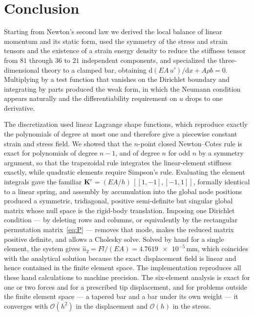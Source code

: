 \documentclass[11pt,a4paper]{article}
\numberwithin{equation}{section}
\theoremstyle{remark}
\newcommand{\bigO}[1]{\mathcal{O}\!\left(#1\right)}
\newcommand{\bK}{\bm{K}}
\begin{document}
\section{Conclusion}\label{sec:conclusion}

Starting from Newton's second law we derived the local balance of linear momentum and its
static form, used the symmetry of the stress and strain tensors and the existence of a
strain energy density to reduce the stiffness tensor from $81$ through $36$ to $21$
independent components, and specialized the three-dimensional theory to a clamped bar,
obtaining $\mathrm{d}(EA\,u')/\mathrm{d}x + A\rho b = 0$. Multiplying by a test function
that vanishes on the Dirichlet boundary and integrating by parts produced the weak form, in
which the Neumann condition appears naturally and the differentiability requirement on $u$
drops to one derivative.

The discretization used linear Lagrange shape functions, which reproduce exactly the
polynomials of degree at most one and therefore give a piecewise constant strain and
stress field. We showed that the $n$-point closed Newton--Cotes rule is exact for
polynomials of degree $n-1$, and of degree $n$ for odd $n$ by a symmetry argument, so that
the trapezoidal rule integrates the linear-element stiffness exactly, while quadratic
elements require Simpson's rule. Evaluating the element integrals gave the familiar
$\bK^e = (EA/h)\,[[1,-1],[-1,1]]$, formally identical to a linear spring, and assembly by
accumulation into the global node positions produced a symmetric, tridiagonal, positive
semi-definite but singular global matrix whose null space is the rigid-body translation.
Imposing one Dirichlet condition --- by deleting rows and columns, or equivalently by the
rectangular permutation matrix~\eqref{eq:P} --- removes that mode, makes the reduced matrix
positive definite, and allows a Cholesky solve. Solved by hand for a single element, the
system gives $\hat u_2 = F l/(EA) = \num{4.7619e-5}\,\mathrm{mm}$, which coincides with the
analytical solution because the exact displacement field is linear and hence contained in
the finite element space. The implementation reproduces all these hand calculations to machine
precision. The six-element analysis is exact for one or two forces and for a prescribed tip
displacement, and for problems outside the finite element space --- a tapered bar and a bar under its
own weight --- it converges with $\bigO{h^2}$ in the displacement and $\bigO{h}$ in the stress.
\end{document}
